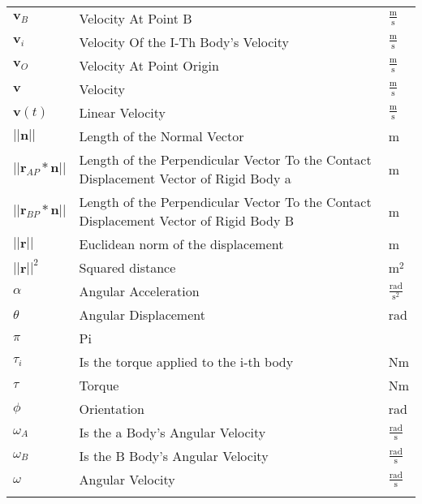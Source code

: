 \documentclass[12pt]{article}
\begin{document}
\begin{longtabu}{l X[l] l}
${\mathbf{v}_{B}}$ & Velocity At Point B & $\frac{\text{m}}{\text{s}}$
\\
${\mathbf{v}_{i}}$ & Velocity Of the I-Th Body's Velocity & $\frac{\text{m}}{\text{s}}$
\\
${\mathbf{v}_{O}}$ & Velocity At Point Origin & $\frac{\text{m}}{\text{s}}$
\\
$\mathbf{v}$ & Velocity & $\frac{\text{m}}{\text{s}}$
\\
$\mathbf{v}(t)$ & Linear Velocity & $\frac{\text{m}}{\text{s}}$
\\
$||\mathbf{n}||$ & Length of the Normal Vector & m
\\
$||{\mathbf{r}_{AP}}*\mathbf{n}||$ & Length of the Perpendicular Vector To the Contact Displacement Vector of Rigid Body a & m
\\
$||{\mathbf{r}_{BP}}*\mathbf{n}||$ & Length of the Perpendicular Vector To the Contact Displacement Vector of Rigid Body B & m
\\
$||\mathbf{r}||$ & Euclidean norm of the displacement & m
\\
${||\mathbf{r}||^{2}}$ & Squared distance & $\text{m}^{2}$
\\
$\alpha{}$ & Angular Acceleration & $\frac{\text{rad}}{\text{s}^{2}}$
\\
$\theta{}$ & Angular Displacement & rad
\\
$\pi{}$ & Pi & 
\\
${\tau{}_{i}}$ & Is the torque applied to the i-th body & Nm
\\
$\tau{}$ & Torque & Nm
\\
$\phi{}$ & Orientation & rad
\\
${\omega{}_{A}}$ & Is the a Body's Angular Velocity & $\frac{\text{rad}}{\text{s}}$
\\
${\omega{}_{B}}$ & Is the B Body's Angular Velocity & $\frac{\text{rad}}{\text{s}}$
\\
$\omega{}$ & Angular Velocity & $\frac{\text{rad}}{\text{s}}$
\\
\bottomrule
\label{Table:TablofSymb}
\end{longtabu}
\end{document}

